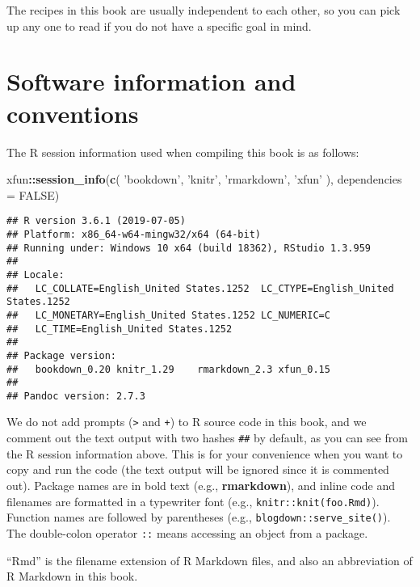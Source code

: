 \documentclass[
  11pt,
]{krantz}
\newenvironment{Shaded}{\begin{snugshade}}{\end{snugshade}}
\newcommand{\DataTypeTok}[1]{\textcolor[rgb]{0.27,0.27,0.27}{#1}}
\newcommand{\KeywordTok}[1]{\textcolor[rgb]{0.27,0.27,0.27}{\textbf{#1}}}
\newcommand{\NormalTok}[1]{#1}
\newcommand{\OperatorTok}[1]{\textcolor[rgb]{0.43,0.43,0.43}{\textbf{#1}}}
\newcommand{\OtherTok}[1]{\textcolor[rgb]{0.37,0.37,0.37}{#1}}
\newcommand{\StringTok}[1]{\textcolor[rgb]{0.5,0.5,0.5}{#1}}
\begin{document}
The recipes in this book are usually independent to each other, so you can pick up any one to read if you do not have a specific goal in mind.

\hypertarget{software-info}{%
\section*{Software information and conventions}\label{software-info}}


The R session information used when compiling this book is as follows:

\begin{Shaded}
\begin{Highlighting}[]
\NormalTok{xfun}\OperatorTok{::}\KeywordTok{session_info}\NormalTok{(}\KeywordTok{c}\NormalTok{(}
  \StringTok{'bookdown'}\NormalTok{, }\StringTok{'knitr'}\NormalTok{, }\StringTok{'rmarkdown'}\NormalTok{, }\StringTok{'xfun'}
\NormalTok{), }\DataTypeTok{dependencies =} \OtherTok{FALSE}\NormalTok{)}
\end{Highlighting}
\end{Shaded}

\begin{verbatim}
## R version 3.6.1 (2019-07-05)
## Platform: x86_64-w64-mingw32/x64 (64-bit)
## Running under: Windows 10 x64 (build 18362), RStudio 1.3.959
## 
## Locale:
##   LC_COLLATE=English_United States.1252  LC_CTYPE=English_United States.1252   
##   LC_MONETARY=English_United States.1252 LC_NUMERIC=C                          
##   LC_TIME=English_United States.1252    
## 
## Package version:
##   bookdown_0.20 knitr_1.29    rmarkdown_2.3 xfun_0.15    
## 
## Pandoc version: 2.7.3
\end{verbatim}

We do not add prompts (\texttt{\textgreater{}} and \texttt{+}) to R source code in this book, and we comment out the text output with two hashes \texttt{\#\#} by default, as you can see from the R session information above. This is for your convenience when you want to copy and run the code (the text output will be ignored since it is commented out). Package names are in bold text (e.g., \textbf{rmarkdown}), and inline code and filenames are formatted in a typewriter font (e.g., \texttt{knitr::knit(\textquotesingle{}foo.Rmd\textquotesingle{})}). Function names are followed by parentheses (e.g., \texttt{blogdown::serve\_site()}). The double-colon operator \texttt{::} means accessing an object from a package.

``Rmd'' is the filename extension of R Markdown files, and also an abbreviation of R Markdown in this book.
\end{document}

